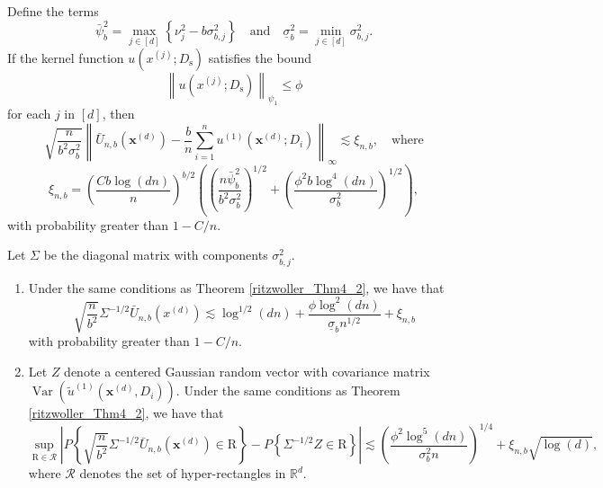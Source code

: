 \documentclass[letterpaper,10pt]{article}
\numberwithin{equation}{section}
\numberwithin{theorem}{section}
\numberwithin{remark}{section}
\numberwithin{example}{section}
\theoremstyle{definition}
\newcommand{\1}{\mathbb{1}}
\begin{document}
\vspace{0.5cm}
\begin{theorem}\label{ritzwoller_Thm4_2}
	Define the terms
	\begin{equation}
		\bar{\psi}_b^2 = \max_{j \in[d]}\left\{\nu_j^2-b \sigma_{b, j}^2\right\}
		\quad \text {and} \quad
		\underline{\sigma}_b^2=\min_{j \in[d]} \sigma_{b, j}^2.
	\end{equation}
	If the kernel function $u\left(x^{(j)} ; D_{\mathrm{s}}\right)$ satisfies the bound
	\begin{equation}
		\left\|u\left(x^{(j)} ; D_{\mathrm{s}}\right)\right\|_{\psi_1} \leq \phi
	\end{equation}
	for each $j$ in $[d]$, then
	\begin{equation}
		\sqrt{\frac{n}{b^2 \sigma_b^2}}\left\|\bar{U}_{n, b}\left(\boldsymbol{x}^{(d)}\right)-\frac{b}{n} \sum_{i=1}^n u^{(1)}\left(\boldsymbol{x}^{(d)} ; D_i\right)\right\|_{\infty} \lesssim \xi_{n, b},
		\quad \text {where}
	\end{equation}
	\begin{equation}
		\xi_{n, b}=\left(\frac{C b \log (d n)}{n}\right)^{b / 2}\left(\left(\frac{n \bar{\psi}_b^2}{b^2 \sigma_b^2}\right)^{1 / 2}+\left(\frac{\phi^2 b \log ^4(d n)}{\sigma_b^2}\right)^{1 / 2}\right),
	\end{equation}
	with probability greater than $1-C / n$.
\end{theorem}

\vspace{0.5cm}
\begin{theorem}
	Let $\Sigma$ be the diagonal matrix with components $\sigma_{b, j}^2$.
	\begin{enumerate}
		\item Under the same conditions as Theorem \ref{ritzwoller_Thm4_2}, we have that
		\begin{equation}
			\sqrt{\frac{n}{b^2}} \Sigma^{-1 / 2} \bar{U}_{n, b}\left(x^{(d)}\right) \lesssim \log ^{1 / 2}(d n)+\frac{\phi \log ^2(d n)}{\underline{\sigma}_b n^{1 / 2}}+\xi_{n, b}
		\end{equation}
		with probability greater than $1-C / n$.
		\item Let $Z$ denote a centered Gaussian random vector with covariance matrix $\operatorname{Var}\left(\tilde{u}^{(1)}\left(\boldsymbol{x}^{(d)}, D_i\right)\right)$. 
		Under the same conditions as Theorem \ref{ritzwoller_Thm4_2}, we have that
		\begin{equation}
			\sup _{\mathrm{R} \in \mathcal{R}}\left|P\left\{\sqrt{\frac{n}{b^2}} \Sigma^{-1 / 2} \bar{U}_{n, b}\left(\boldsymbol{x}^{(d)}\right) \in \mathrm{R}\right\}-P\left\{\Sigma^{-1 / 2} Z \in \mathrm{R}\right\}\right|
			\lesssim\left(\frac{\phi^2 \log ^5(d n)}{\sigma_b^2 n}\right)^{1 / 4}+\xi_{n, b} \sqrt{\log (d)},
		\end{equation}
		where $\mathcal{R}$ denotes the set of hyper-rectangles in $\mathbb{R}^d$.
	\end{enumerate}
\end{theorem}
\end{document}
